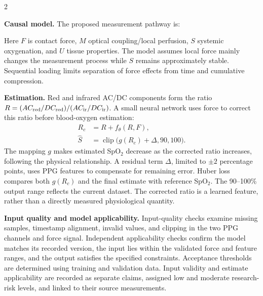 \documentclass[10pt]{article}
\begin{document}
\begin{multicols*}{2}
\begin{samepage}
\textbf{Causal model.} The proposed measurement pathway is:
\begin{center}
\end{center}
\end{samepage}
Here $F$ is contact force, $M$ optical coupling/local perfusion, $S$ systemic oxygenation, and $U$ tissue properties. The model assumes local force mainly changes the measurement process while $S$ remains approximately stable. Sequential loading limits separation of force effects from time and cumulative compression.

\textbf{Estimation.} Red and infrared AC/DC components form the ratio $R=(AC_{\rm red}/DC_{\rm red})/(AC_{\rm ir}/DC_{\rm ir})$. A small neural network uses force to correct this ratio before blood-oxygen estimation:
\begin{align}
R_c&=R+f_\theta(R,F),\\
\hat S&=\operatorname{clip}\bigl(g(R_c)+\Delta,90,100\bigr).
\end{align}
The mapping $g$ makes estimated SpO$_2$ decrease as the corrected ratio increases, following the physical relationship. A residual term $\Delta$, limited to $\pm2$ percentage points, uses PPG features to compensate for remaining error. Huber loss compares both $g(R_c)$ and the final estimate with reference SpO$_2$. The 90--100\% output range reflects the current dataset. The corrected ratio is a learned feature, rather than a directly measured physiological quantity.

\textbf{Input quality and model applicability.} Input-quality checks examine missing samples, timestamp alignment, invalid values, and clipping in the two PPG channels and force signal. Independent applicability checks confirm the model matches its recorded version, the input lies within the validated force and feature ranges, and the output satisfies the specified constraints. Acceptance thresholds are determined using training and validation data. Input validity and estimate applicability are recorded as separate claims, assigned low and moderate research-risk levels, and linked to their source measurements.


\end{multicols*}
\end{document}
